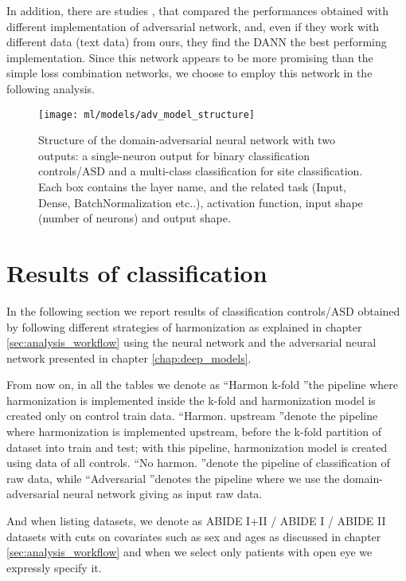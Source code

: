 \documentclass[11pt]{report}
\begin{document}
In addition, there are studies \cite{kamath2019}, that compared the performances obtained with different implementation of adversarial network, and, even if they work with different data (text data) from ours, they find the DANN the best performing implementation.
Since this network appears to be more promising than the simple loss combination networks, we choose to employ this network in the following analysis.




\begin{figure}[h!]
\centering
\texttt{[image: ml/models/adv\_model\_structure]}
\caption{Structure of the domain-adversarial neural network with two outputs: a single-neuron output for binary classification controls/ASD and a multi-class classification for site classification.
Each box contains the layer name, and the related task (Input, Dense, BatchNormalization etc..), activation function, input shape (number of neurons) and output shape.
}
\label{fig:adv_model_structure}
\end{figure}


\newpage
\chapter{Results of classification} \label{chap:results_deeplearning}
In the following section we report results of classification controls/ASD obtained by following different strategies of harmonization as explained in chapter \ref{sec:analysis_workflow} using the neural network and the adversarial neural network presented in chapter \ref{chap:deep_models}.

From now on, in all the tables we denote as \textquotedblleft Harmon k-fold \textquotedblright the pipeline where harmonization is implemented inside the k-fold and harmonization model is created only on control train data. \textquotedblleft Harmon. upstream \textquotedblright denote the pipeline where harmonization is implemented upstream, before the k-fold partition of dataset into train and test; with this pipeline, harmonization model is created using data of all controls.  \textquotedblleft No harmon. \textquotedblright denote the pipeline of classification of raw data, while  \textquotedblleft Adversarial \textquotedblright denotes the pipeline where we use the domain-adversarial neural network giving as input raw data.

And when listing datasets, we denote as ABIDE I+II / ABIDE I / ABIDE II datasets with cuts on covariates such as sex and ages as discussed in chapter \ref{sec:analysis_workflow} and when we select only patients with open eye we expressly specify it.
\end{document}
